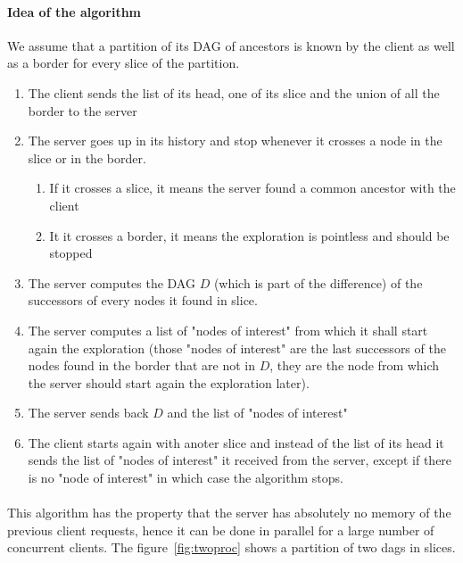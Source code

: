 \paragraph{Idea of the algorithm} We assume that a partition of its DAG of ancestors is known by the client as well as a border for every slice of the partition.
\begin{enumerate}
 \item The client sends the list of its head, one of its slice and the union of all the border to the server
 \item The server goes up in its history and stop whenever it crosses a node in the slice or in the border.
 \begin{enumerate}
  \item If it crosses a slice, it means the server found a common ancestor with the client
  \item It it crosses a border, it means the exploration is pointless and should be stopped
 \end{enumerate}
 \item The server computes the DAG $D$ (which is part of the difference) of the successors of every nodes it found in slice.
 \item The server computes a list of "nodes of interest" from which it shall start again the exploration (those "nodes of interest" are the last successors of the nodes found in the border that are not in $D$, they are the node from which the server should start again the exploration later).
 \item The server sends back $D$ and the list of "nodes of interest"
 \item The client starts again with anoter slice and instead of the list of its head it sends the list of "nodes of interest" it received from the server, except if there is no "node of interest" in which case the algorithm stops.
\end{enumerate}
\paragraph{} This algorithm has the property that the server has absolutely no memory of the previous client requests, hence it can be done in parallel for a large number of concurrent clients. The figure~\ref{fig:twoproc} shows a partition of two dags in slices.


